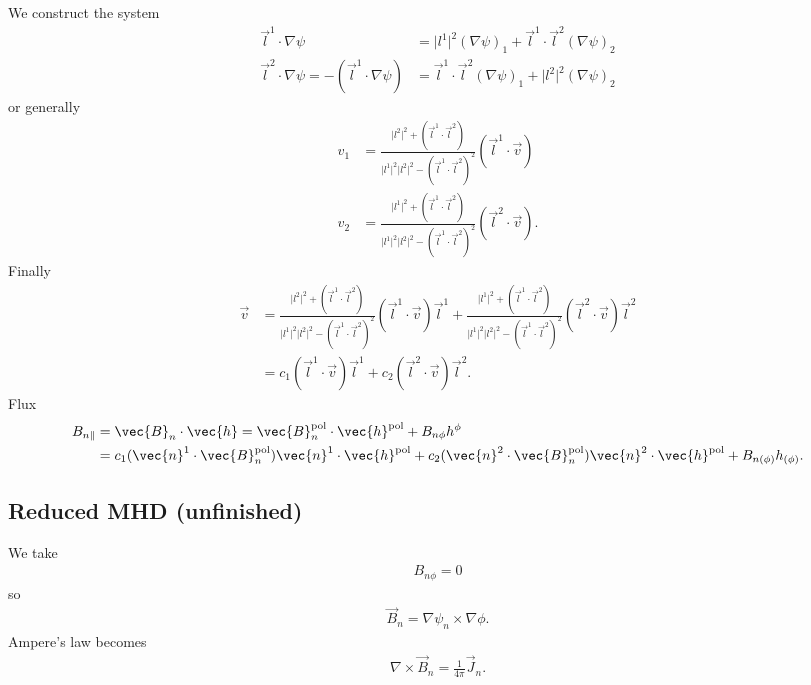 We construct the system
\begin{align*}
  \vec{l}^{1} \cdot \nabla \psi &= \lvert l^{1} \rvert^{2} (\nabla \psi)_{1} + \vec{l}^{1} \cdot \vec{l}^{2} (\nabla \psi)_{2} \\
  \vec{l}^{2} \cdot \nabla \psi = -(\vec{l}^{1} \cdot \nabla \psi) &= \vec{l}^{1} \cdot \vec{l}^{2} (\nabla \psi)_{1} + \lvert l^{2} \rvert^{2} (\nabla \psi)_{2}
\end{align*}
or generally
\begin{align*}
  v_{1} &= \frac{\lvert l^{2} \rvert^{2} + (\vec{l}^{1} \cdot \vec{l}^{2})}{\lvert l^{1} \rvert^{2} \lvert l^{2} \rvert^{2} - (\vec{l}^{1} \cdot \vec{l}^{2})^{2}} (\vec{l}^{1} \cdot \vec{v}) \\
  v_{2} &= \frac{\lvert l^{1} \rvert^{2} + (\vec{l}^{1} \cdot \vec{l}^{2})}{\lvert l^{1} \rvert^{2} \lvert l^{2} \rvert^{2} - (\vec{l}^{1} \cdot \vec{l}^{2})^{2}} (\vec{l}^{2} \cdot \vec{v}).
\end{align*}
Finally
\begin{align}
  \vec{v} &= \frac{\lvert l^{2} \rvert^{2} + (\vec{l}^{1} \cdot \vec{l}^{2})}{\lvert l^{1} \rvert^{2} \lvert l^{2} \rvert^{2} - (\vec{l}^{1} \cdot \vec{l}^{2})^{2}}(\vec{l}^{1} \cdot \vec{v}) \vec{l}^{1} + \frac{\lvert l^{1} \rvert^{2} + (\vec{l}^{1} \cdot \vec{l}^{2})}{\lvert l^{1} \rvert^{2} \lvert l^{2} \rvert^{2} - (\vec{l}^{1} \cdot \vec{l}^{2})^{2}}(\vec{l}^{2} \cdot \vec{v}) \vec{l}^{2} \\
  &= c_{1} (\vec{l}^{1} \cdot \vec{v}) \vec{l}^{1} + c_{2} (\vec{l}^{2} \cdot \vec{v}) \vec{l}^{2}.
\end{align}
Flux
\begin{align}
  B_{n \parallel} &= \vec{B}_{n} \cdot \vec{h} = \vec{B}_{n}^{\pol} \cdot \vec{h}^{\pol} + B_{n \phi} h^{\phi} \nonumber \\
  &= c_{1} (\vec{n}^{1} \cdot \vec{B}_{n}^{\pol}) \vec{n}^{1} \cdot \vec{h}^{\pol} + c_{2} (\vec{n}^{2} \cdot \vec{B}_{n}^{\pol}) \vec{n}^{2} \cdot \vec{h}^{\pol} + B_{n (\phi)} h_{(\phi)}.
\end{align}

\subsection{Reduced MHD (unfinished)}

We take
\begin{gather*}
  B_{n \phi} = 0
\end{gather*}
so
\begin{gather*}
  \vec{B}_{n} = \nabla \psi_{n} \times \nabla \phi.
\end{gather*}
Ampere's law becomes
\begin{gather*}
  \nabla \times \vec{B}_{n} = \frac{1}{4 \pi} \vec{J}_{n}.
\end{gather*}

